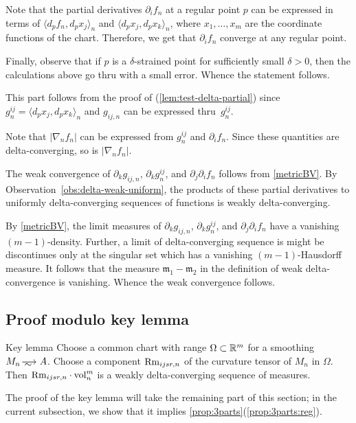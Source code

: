 Note that the partial derivatives $\partial_if_n$ at a regular point $p$ can be expressed in terms of $\langle d_pf_n,d_px_j\rangle_n$ and $\langle d_px_j,d_px_k\rangle_n$, where $x_1,\dots,x_m$ are the coordinate functions of the chart.
Therefore, we get that $\partial_if_n$ converge at any regular point.

Finally, observe that if $p$ is a $\delta$-strained point for sufficiently small $\delta>0$,
then the calculations above go thru with a small error.
Whence the statement follows.

 This part follows from the proof of (\ref{lem:test-delta-partial}) since $g^{ij}_n=\langle d_px_j,d_px_k\rangle_n$ and $g_{ij,n}$ can be expressed thru~$g^{ij}_n$.

Note that $|\nabla_n f_n|$ can be expressed from $g^{ij}_n$ and $\partial_if_n$.
Since these quantities are delta-converging, so is $|\nabla_n f_n|$.

 The weak convergence of $\partial_kg_{ij,n}$, $\partial_k g^{ij}_n$, and $\partial_j\partial_if_n$
follows from \ref{metricBV}.
By Observation~\ref{obs:delta-weak-uniform}, the products of these partial derivatives to uniformly delta-converging sequences of functions is weakly delta-converging.

By \ref{metricBV}, the limit measures of $\partial_kg_{ij,n}$, $\partial_k g^{ij}_n$, and $\partial_j\partial_if_n$ have a vanishing $(m-1)$-density.
Further, a limit of delta-converging sequence is might be discontinues only at the singular set which has a vanishing $(m-1)$-Hausdorff measure.
It follows that the measure $\mathfrak{m}_1-\mathfrak{m}_2$ in the definition of weak delta-convergence is vanishing. 
Whence the weak convergence follows.
\qeds

\subsection{Proof modulo key lemma}

\begin{thm}{Key lemma}\label{A^0}
Choose a common chart with range $\Omega\subset \mathbb{R}^m$ for a smoothing $M_n\smooths{} A$.
Choose a component $\operatorname{\rm Rm}_{ijsr,n}$ of the curvature tensor of $M_n$ in $\Omega$.
Then $\Rm_{ijsr,n}\cdot \vol^m_n$ is a weakly delta-converging sequence of measures.
\end{thm}

The proof of the key lemma will take the remaining part of this section;
in the current subsection, we show that it implies \ref{prop:3parts}(\ref{prop:3parts:reg}).

